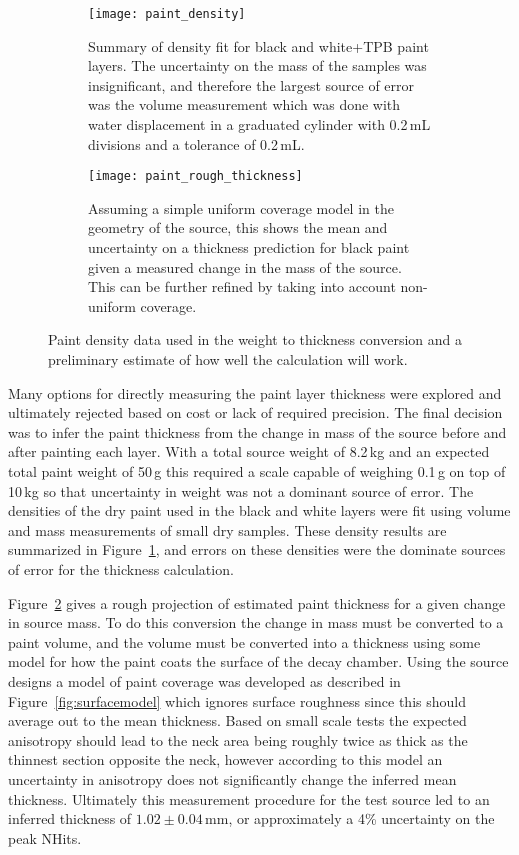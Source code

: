 \begin{figure}[h!]
\begin{subfigure}{.45\textwidth}
  \texttt{[image: paint\_density]}
  \caption{Summary of density fit for black and white+TPB paint layers. The uncertainty on the mass of the samples was insignificant, and therefore the largest source of error was the volume measurement which was done with water displacement in a graduated cylinder with 0.2\,mL divisions and a tolerance of 0.2\,mL.}
  \label{fig:paintdensity}
\end{subfigure}
\hspace{0.5cm}
\begin{subfigure}{.45\textwidth}
  \texttt{[image: paint\_rough\_thickness]}
  \caption{Assuming a simple uniform coverage model in the geometry of the source, this shows the mean and uncertainty on a thickness prediction for black paint given a measured change in the mass of the source. This can be further refined by taking into account non-uniform coverage. }
  \label{fig:paintthickness}
\end{subfigure}
\caption{Paint density data used in the weight to thickness conversion and a preliminary estimate of how well the calculation will work.}
\label{fig:weightmeasure}
\end{figure}

Many options for directly measuring the paint layer thickness were explored and ultimately rejected based on cost or lack of required precision. The final decision was to infer the paint thickness from the change in mass of the source before and after painting each layer. With a total source weight of 8.2\,kg and an expected total paint weight of 50\,g this required a scale capable of weighing 0.1\,g on top of 10\,kg so that uncertainty in weight was not a dominant source of error. The densities of the dry paint used in the black and white layers were fit using volume and mass measurements of small dry samples. These density results are summarized in Figure~\ref{fig:paintdensity}, and errors on these densities were the dominate sources of error for the thickness calculation. 

Figure~\ref{fig:paintthickness} gives a rough projection of estimated paint thickness for a given change in source mass. To do this conversion the change in mass must be converted to a paint volume, and the volume must be converted into a thickness using some model for how the paint coats the surface of the decay chamber. Using the source designs a model of paint coverage was developed as described in Figure~\ref{fig:surfacemodel} which ignores surface roughness since this should average out to the mean thickness. Based on small scale tests the expected anisotropy should lead to the neck area being roughly twice as thick as the thinnest section opposite the neck, however according to this model an uncertainty in anisotropy does not significantly change the inferred mean thickness. Ultimately this measurement procedure for the test source led to an inferred thickness of $1.02\pm0.04$\,mm, or approximately a 4\% uncertainty on the peak NHits.

